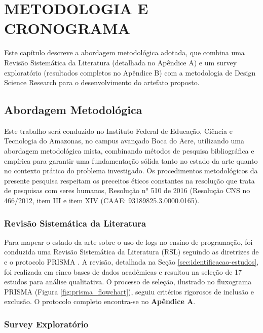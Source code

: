 \chapter{METODOLOGIA E CRONOGRAMA}
\label{cap:metodologia}

Este capítulo descreve a abordagem metodológica adotada, que combina uma Revisão Sistemática da Literatura (detalhada no Apêndice A) e um survey exploratório (resultados completos no Apêndice B) com a metodologia de Design Science Research para o desenvolvimento do artefato proposto. 

\section{Abordagem Metodológica}
\label{sec:abordagem-metodologica}
Este trabalho será conduzido no Instituto Federal de Educação, Ciência e Tecnologia do Amazonas, no campus avançado Boca do Acre, utilizando uma abordagem metodológica mista, combinando métodos de pesquisa bibliográfica e empírica para garantir uma fundamentação sólida tanto no estado da arte quanto no contexto prático do problema investigado. Os procedimentos metodológicos da presente pesquisa respeitam os preceitos éticos constantes na resolução que trata de pesquisas com seres humanos, Resolução n° 510 de 2016 (Resolução CNS no 466/2012, item III e item XIV (CAAE: 93189825.3.0000.0165).

\subsection{Revisão Sistemática da Literatura}
\label{subsec:revisao-sistematica}

Para mapear o estado da arte sobre o uso de logs no ensino de programação, foi conduzida uma Revisão Sistemática da Literatura (RSL) seguindo as diretrizes de \cite{kitchenham2004procedures} e o protocolo PRISMA \cite{page2021prisma}. A revisão, detalhada na Seção \ref{sec:identificacao-estudos}, foi realizada em cinco bases de dados acadêmicas e resultou na seleção de 17 estudos para análise qualitativa. O processo de seleção, ilustrado no fluxograma PRISMA (Figura \ref{fig:prisma_flowchart}), seguiu critérios rigorosos de inclusão e exclusão. O protocolo completo encontra-se no \textbf{Apêndice A}.

\subsection{Survey Exploratório}
\label{subsec:survey}

